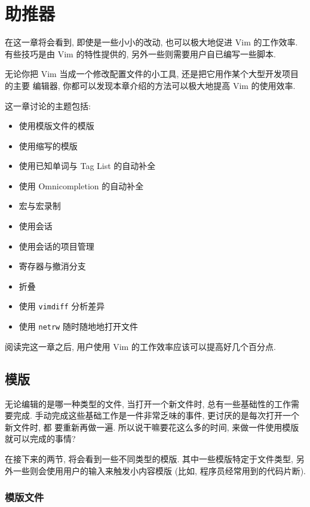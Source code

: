 \chapter{助推器}
\label{chap:production_boosters}

在这一章将会看到, 即使是一些小小的改动, 也可以极大地促进 Vim 的工作效率.
有些技巧是由 Vim 的特性提供的, 另外一些则需要用户自已编写一些脚本.

无论你把 Vim 当成一个修改配置文件的小工具, 还是把它用作某个大型开发项目的主要
编辑器, 你都可以发现本章介绍的方法可以极大地提高 Vim 的使用效率.

这一章讨论的主题包括:
\begin{itemize}
    \item 使用模版文件的模版
    \item 使用缩写的模版
    \item 使用已知单词与 Tag List 的自动补全
    \item 使用 Omnicompletion 的自动补全
    \item 宏与宏录制
    \item 使用会话
    \item 使用会话的项目管理
    \item 寄存器与撤消分支
    \item 折叠
    \item 使用 \texttt{vimdiff} 分析差异
    \item 使用 \texttt{netrw} 随时随地地打开文件
\end{itemize}

阅读完这一章之后, 用户使用 Vim 的工作效率应该可以提高好几个百分点.

\section{模版}
\label{sec:using_templates}

无论编辑的是哪一种类型的文件, 当打开一个新文件时, 总有一些基础性的工作需要完成.
手动完成这些基础工作是一件非常乏味的事件, 更讨厌的是每次打开一个新文件时, 都
要重新再做一遍. 所以说干嘛要花这么多的时间, 来做一件使用模版就可以完成的事情?

在接下来的两节, 将会看到一些不同类型的模版. 其中一些模版特定于文件类型, 另
外一些则会使用用户的输入来触发小内容模版 (比如, 程序员经常用到的代码片断).

\subsection{模版文件}
\label{subsec:using_template_files}

